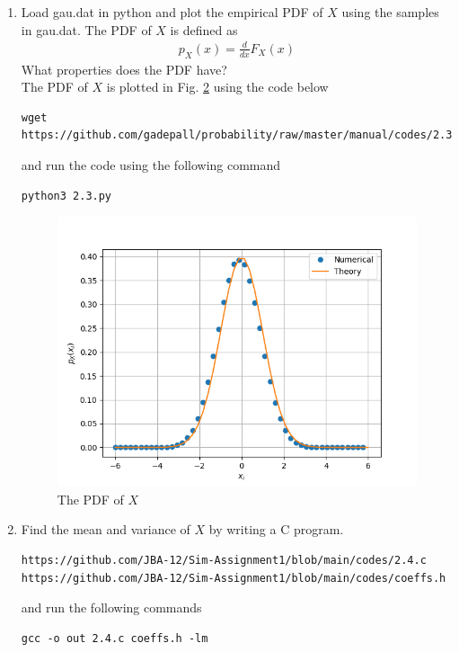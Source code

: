 \documentclass[journal,12pt,twocolumn]{IEEEtran}
\renewcommand\thesection{\arabic{section}}
\begin{document}
\begin{enumerate}[label=\thesection.\arabic*
,ref=\thesection.\theenumi]
\begin{figure}[!htbp]
\caption{The CDF of $X$}
\label{fig:gauss_cdf}
\end{figure}
\item
Load gau.dat in python and plot the empirical PDF of $X$ using the samples in gau.dat. The PDF of $X$ is defined as
\begin{align}
p_{X}(x) = \frac{d}{dx}F_{X}(x)
\end{align}
What properties does the PDF have?
\\
\solution The PDF of $X$ is plotted in Fig. \ref{fig:gauss_pdf} using the code below
\begin{lstlisting}
wget https://github.com/gadepall/probability/raw/master/manual/codes/2.3.py
\end{lstlisting}
and run the code using the following command
\begin{lstlisting}
python3 2.3.py
\end{lstlisting}
\begin{figure}[!htbp]
\centering
\includegraphics[width=\columnwidth]{./figs/gauss_pdf}
\caption{The PDF of $X$}
\label{fig:gauss_pdf}
\end{figure}
\item Find the mean and variance of $X$ by writing a C program.\\
\solution 
\begin{lstlisting}
https://github.com/JBA-12/Sim-Assignment1/blob/main/codes/2.4.c
https://github.com/JBA-12/Sim-Assignment1/blob/main/codes/coeffs.h
\end{lstlisting}
and run the following commands 
\begin{lstlisting}
gcc -o out 2.4.c coeffs.h -lm

\end{lstlisting}
\end{enumerate}
\end{document}
